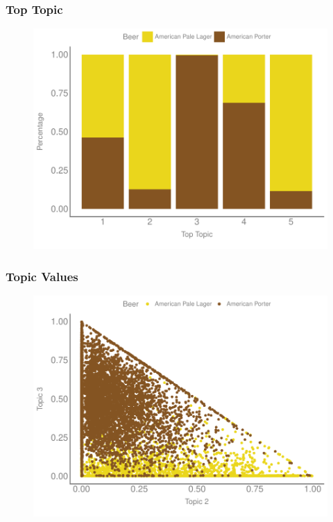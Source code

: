  \begin{frame}
    \frametitle{Top Topic}
\begin{figure}[htb]
\centering
\includegraphics[scale=0.6]{img/figures/topic_stacked_1gram}
\end{figure}
\end{frame}

 \begin{frame}
    \frametitle{Topic Values}
\begin{figure}[htb]
\centering
\includegraphics[scale=0.6]{img/figures/topic_scatter_1gram}
\end{figure}
\end{frame}

